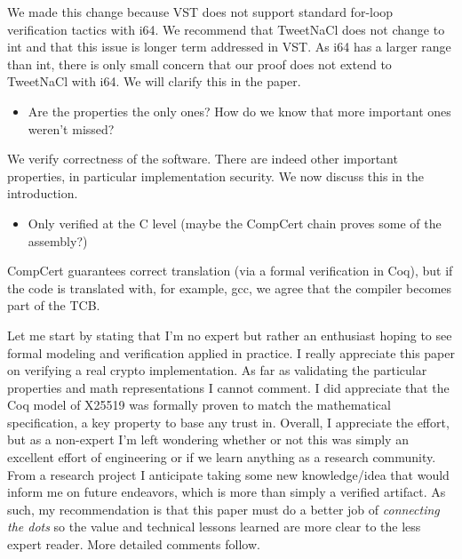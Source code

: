 \begin{answer}
    We made this change because VST does not support standard for-loop
    verification tactics with i64. We recommend that TweetNaCl does not change to
    int and that this issue is longer term addressed in VST. As i64 has a larger
    range than int, there is only small concern that our proof does not extend to
    TweetNaCl with i64. We will clarify this in the paper.
\end{answer}

\begin{itemize}
    \item Are the properties the only ones? How do we know that more important ones weren’t missed?
\end{itemize}
\begin{answer}
  We verify correctness of the software. There are indeed other important properties, in particular
  implementation security. We now discuss this in the introduction.
\end{answer}

\begin{itemize}
    \item Only verified at the C level (maybe the CompCert chain proves some of the assembly?)
\end{itemize}
\begin{answer}
  CompCert guarantees correct translation (via a formal verification in Coq), 
  but if the code is translated with, for example, gcc, we agree that the compiler becomes part of the TCB.
\end{answer}



\begin{center}
\end{center}

Let me start by stating that I’m no expert but rather an enthusiast hoping to see formal modeling and verification applied in practice. I really appreciate this paper on verifying a real crypto implementation. As far as validating the particular properties and math representations I cannot comment. I did appreciate that the Coq model of X25519 was formally proven to match the mathematical specification, a key property to base any trust in. Overall, I appreciate the effort, but as a non-expert I’m left wondering whether or not this was simply an excellent effort of engineering or if we learn anything as a research community. From a research project I anticipate taking some new knowledge/idea that would inform me on future endeavors, which is more than simply a verified artifact. As such, my recommendation is that this paper must do a better job of \textit{connecting the dots} so the value and technical lessons learned are more clear to the less expert reader. More detailed comments follow.


